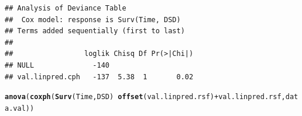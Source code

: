 \documentclass{article}\usepackage[]{graphicx}\usepackage[]{color}
\makeatletter
\newcommand{\hlopt}[1]{\textcolor[rgb]{0,0,0}{#1}}%
\newcommand{\hlstd}[1]{\textcolor[rgb]{0.345,0.345,0.345}{#1}}%
\newcommand{\hlkwd}[1]{\textcolor[rgb]{0.737,0.353,0.396}{\textbf{#1}}}%
\newenvironment{kframe}{%
 \def\at@end@of@kframe{}%
 \ifinner\ifhmode%
  \def\at@end@of@kframe{\end{minipage}}%
  \begin{minipage}{\columnwidth}%
 \fi\fi%
 \def\FrameCommand##1{\hskip\@totalleftmargin \hskip-\fboxsep
 \colorbox{shadecolor}{##1}\hskip-\fboxsep
     \hskip-\linewidth \hskip-\@totalleftmargin \hskip\columnwidth}%
 \MakeFramed {\advance\hsize-\width
   \@totalleftmargin\z@ \linewidth\hsize
   \@setminipage}}%
 {\par\unskip\endMakeFramed%
 \at@end@of@kframe}
\newenvironment{knitrout}{}{} %
\makeatother
\begin{document}
\begin{knitrout}
\begin{kframe}
\begin{alltt}
\end{alltt}
\begin{verbatim}
## Analysis of Deviance Table
##  Cox model: response is Surv(Time, DSD)
## Terms added sequentially (first to last)
## 
##                 loglik Chisq Df Pr(>|Chi|)
## NULL              -140                    
## val.linpred.cph   -137  5.38  1       0.02
\end{verbatim}
\begin{alltt}
\hlkwd{anova}\hlstd{(}\hlkwd{coxph}\hlstd{(}\hlkwd{Surv}\hlstd{(Time, DSD)} \hlopt{~} \hlkwd{offset}\hlstd{(val.linpred.rsf)} \hlopt{+} \hlstd{val.linpred.rsf, data.val))}
\end{alltt}


{\ttfamily\noindent\color{warningcolor}{\#\# Warning in fitter(X, Y, strats, offset, init, control, weights = weights, : Ran out of iterations and did not converge}}


\end{kframe}
\end{knitrout}
\end{document}
